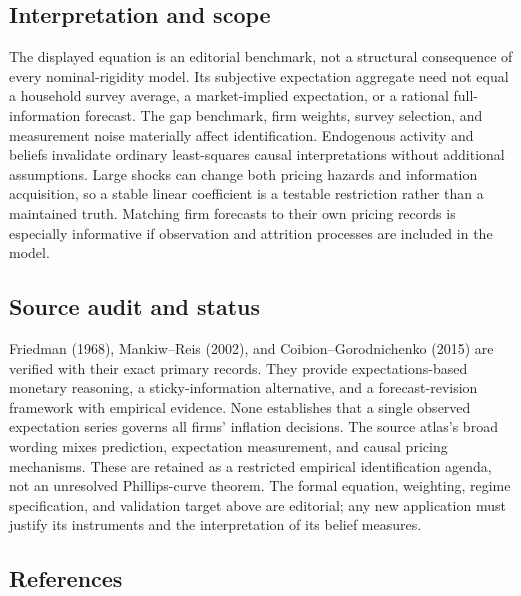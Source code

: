 \documentclass[11pt,a4paper]{article}
\begin{document}
\subsection*{Interpretation and scope}

The displayed equation is an editorial benchmark, not a structural consequence of every nominal-rigidity model. Its subjective expectation aggregate need not equal a household survey average, a market-implied expectation, or a rational full-information forecast. The gap benchmark, firm weights, survey selection, and measurement noise materially affect identification. Endogenous activity and beliefs invalidate ordinary least-squares causal interpretations without additional assumptions. Large shocks can change both pricing hazards and information acquisition, so a stable linear coefficient is a testable restriction rather than a maintained truth. Matching firm forecasts to their own pricing records is especially informative if observation and attrition processes are included in the model.

\subsection*{Source audit and status}

Friedman (1968), Mankiw--Reis (2002), and Coibion--Gorodnichenko (2015) are verified with their exact primary records. They provide expectations-based monetary reasoning, a sticky-information alternative, and a forecast-revision framework with empirical evidence. None establishes that a single observed expectation series governs all firms' inflation decisions. The source atlas's broad wording mixes prediction, expectation measurement, and causal pricing mechanisms. These are retained as a restricted empirical identification agenda, not an unresolved Phillips-curve theorem. The formal equation, weighting, regime specification, and validation target above are editorial; any new application must justify its instruments and the interpretation of its belief measures.

\subsection*{References}
\end{document}
